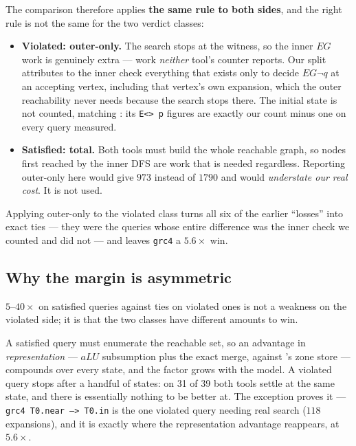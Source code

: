 The comparison therefore applies \textbf{the same rule to both sides}, and the right rule is not
the same for the two verdict classes:

\begin{itemize}
  \item \textbf{Violated: outer-only.} The search stops at the witness, so the inner $EG$ work is
        genuinely extra --- work \emph{neither} tool's counter reports. Our split attributes to
        the inner check everything that exists only to decide $EG\lnot q$ at an accepting vertex,
        including that vertex's own expansion, which the outer reachability never needs because
        the search stops there. The initial state is not counted, matching \verifyta{}: its
        \texttt{E<> p} figures are exactly our count minus one on every query measured.
  \item \textbf{Satisfied: total.} Both tools must build the whole reachable graph, so nodes first
        reached by the inner DFS are work that is needed regardless. Reporting outer-only here
        would give $973$ instead of $1790$ and would \emph{understate our real cost}. It is not
        used.
\end{itemize}

Applying outer-only to the violated class turns all six of the earlier ``losses'' into exact ties
--- they were the queries whose entire difference was the inner check we counted and \verifyta{}
did not --- and leaves \texttt{grc4} a $5.6\times$ win.

\subsection{Why the margin is asymmetric}

$5$--$40\times$ on satisfied queries against ties on violated ones is not a weakness on the
violated side; it is that the two classes have different amounts to win.

A satisfied query must enumerate the reachable set, so an advantage in \emph{representation} ---
$aLU$ subsumption plus the exact merge, against \verifyta{}'s zone store --- compounds over every
state, and the factor grows with the model. A violated query stops after a handful of states:
on 31 of 39 both tools settle at the same state, and there is essentially nothing to be better at.
The exception proves it --- \texttt{grc4 T0.near --> T0.in} is the one violated query needing real
search ($118$ expansions), and it is exactly where the representation advantage reappears, at
$5.6\times$.

